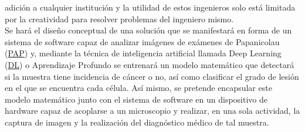     adición a cualquier institución y la utilidad de estos ingenieros solo está
    limitada por la creatividad para resolver problemas del ingeniero
    mismo.~\cite{Kelleher2015} \\ 
    Se hará el diseño conceptual de una solución que se manifestará en forma de
    un sistema de software capaz de analizar imágenes de exámenes de Papanicolau
    (\hyperlink{abbr}{PAP}) y, mediante la
    técnica de inteligencia artificial llamada Deep Learning
    (\hyperlink{abbr}{DL}) o Aprendizaje
    Profundo se entrenará un modelo matemático que detectará si la muestra tiene
    incidencia de cáncer o no, así como clasificar el grado de lesión en el que
    se encuentra cada célula. Así mismo, se pretende encapsular este modelo
    matemático junto con el sistema de software en un dispositivo de hardware
    capaz de acoplarse a un microscopio y realizar, en una sola actividad, la
    captura de imagen y la realización del diagnóstico médico de tal
    muestra.~\cite{Engelbrecht2005} \\

